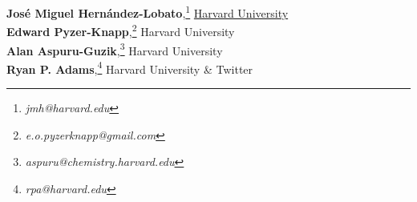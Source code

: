 \textbf{Jos\'e Miguel Hern\'andez-Lobato},\footnote{\textit{jmh@harvard.edu}} 
\href{https://www.jmhl.org}{Harvard University}\\ 
\textbf{Edward Pyzer-Knapp},\footnote{\textit{e.o.pyzerknapp@gmail.com}} {Harvard University}\\
\textbf{Alan Aspuru-Guzik},\footnote{\textit{aspuru@chemistry.harvard.edu }} {Harvard University}\\
\textbf{Ryan P. Adams},\footnote{\textit{rpa@harvard.edu}} {Harvard University} \& {Twitter}
